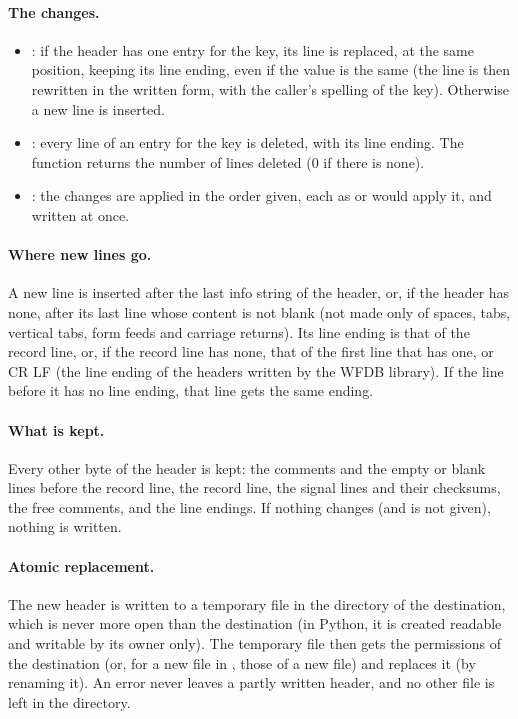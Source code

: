 \paragraph{The changes.}
\begin{itemize}
\item {}: if the header has one entry for the key, its line
  is replaced, at the same position, keeping its line ending, even if the
  value is the same (the line is then rewritten in the written form, with the
  caller's spelling of the key). Otherwise a new line is inserted.
\item {}: every line of an entry for the key is deleted,
  with its line ending. The function returns the number of lines deleted (0
  if there is none).
\item {}: the changes are applied in the order given,
  each as  or  would apply it, and
  written at once.
\end{itemize}

\paragraph{Where new lines go.} A new line is inserted after the last info
string of the header, or, if the header has none, after its last line whose
content is not blank (not made only of spaces, tabs, vertical tabs, form
feeds and carriage returns). Its line ending is that of the record line, or,
if the record line has none, that of the first line that has one, or CR LF
(the line ending of the headers written by the WFDB library). If the line
before it has no line ending, that line gets the same ending.

\paragraph{What is kept.} Every other byte of the header is kept: the
comments and the empty or blank lines before the record line, the record
line, the signal lines and their checksums, the free comments, and the line
endings. If nothing changes (and  is not given), nothing is
written.

\paragraph{Atomic replacement.} The new header is written to a temporary
file in the directory of the destination, which is never more open than the
destination (in Python, it is created readable and writable by its owner
only). The temporary file then gets the permissions of the destination (or,
for a new file in , those of a new file) and replaces it (by
renaming it). An error never leaves a partly written header, and no other
file is left in the directory.

